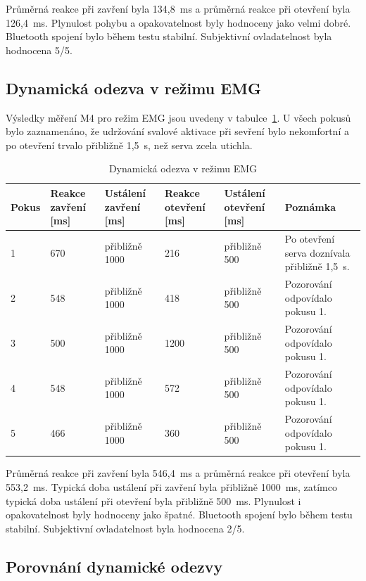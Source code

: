 Průměrná reakce při zavření byla 134{,}8~ms a průměrná reakce při otevření byla 126{,}4~ms. Plynulost pohybu a opakovatelnost byly hodnoceny jako velmi dobré. Bluetooth spojení bylo během testu stabilní. Subjektivní ovladatelnost byla hodnocena 5/5.

\subsection{Dynamická odezva v režimu EMG}
\label{subsec:dynamika-emg}

Výsledky měření M4 pro režim EMG jsou uvedeny v tabulce~\ref{tab:emg-otevrit-zavrit}. U všech pokusů bylo zaznamenáno, že udržování svalové aktivace při sevření bylo nekomfortní a po otevření trvalo přibližně 1,5~s, než serva zcela utichla.

\begin{table}[htbp]
\centering
\caption{Dynamická odezva v režimu EMG}
\label{tab:emg-otevrit-zavrit}
\begin{tabular}{|p{}|p{}|p{}|p{}|p{}|p{}|}
\hline
\textbf{Pokus} & \textbf{Reakce zavření [ms]} & \textbf{Ustálení zavření [ms]} & \textbf{Reakce otevření [ms]} & \textbf{Ustálení otevření [ms]} & \textbf{Poznámka} \\
\hline
1 & 670 & přibližně 1000 & 216 & přibližně 500 & Po otevření serva doznívala přibližně 1,5~s. \\
\hline
2 & 548 & přibližně 1000 & 418 & přibližně 500 & Pozorování odpovídalo pokusu 1. \\
\hline
3 & 500 & přibližně 1000 & 1200 & přibližně 500 & Pozorování odpovídalo pokusu 1. \\
\hline
4 & 548 & přibližně 1000 & 572 & přibližně 500 & Pozorování odpovídalo pokusu 1. \\
\hline
5 & 466 & přibližně 1000 & 360 & přibližně 500 & Pozorování odpovídalo pokusu 1. \\
\hline
\end{tabular}
\end{table}

Průměrná reakce při zavření byla 546{,}4~ms a průměrná reakce při otevření byla 553{,}2~ms. Typická doba ustálení při zavření byla přibližně 1000~ms, zatímco typická doba ustálení při otevření byla přibližně 500~ms. Plynulost i opakovatelnost byly hodnoceny jako špatné. Bluetooth spojení bylo během testu stabilní. Subjektivní ovladatelnost byla hodnocena 2/5.

\subsection{Porovnání dynamické odezvy}
\label{subsec:porovnani-dynamiky}

